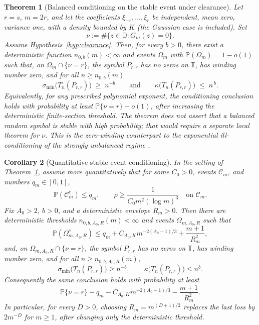 \documentclass[11pt]{amsart}
\numberwithin{equation}{section}
\newtheorem{theorem}{Theorem}[section]
\newtheorem{corollary}[theorem]{Corollary}
\theoremstyle{definition}
\theoremstyle{remark}
\newcommand{\T}{\mathbb T}
\newcommand{\D}{\mathbb D}
\newcommand{\Prob}{\mathbb P}
\newcommand{\smin}{\sigma_{\min}}
\newcommand{\kdn}{\kappa}
\begin{document}
\begin{theorem}[Balanced conditioning on the stable event under clearance]\label{thm:main}
Let $r=s$, $m=2r$, and let the coefficients $\xi_{-r},\dots,\xi_r$ be independent, mean zero, variance one, with a density bounded by $K$ (the Gaussian case is included). Set
\[
  \nu:=\#\{z\in\D:G_m(z)=0\}.
\]
Assume Hypothesis~\ref{hyp:clearance}. Then, for every \(b>0\), there exist a
deterministic function \(n_{0,b}(m)<\infty\) and events
\(\Omega_m\) with \(\Prob(\Omega_m)=1-o(1)\) such that, on
\(\Omega_m\cap\{\nu=r\}\), the symbol \(P_{r,r}\) has no zeros on \(\T\), has
winding number zero, and for all \(n\ge n_{0,b}(m)\)
\begin{equation}\label{eq:main}
  \smin\bigl(T_n(P_{r,r})\bigr)\;\ge\;n^{-b}
  \qquad\text{and}\qquad
  \kdn\bigl(T_n(P_{r,r})\bigr)\;\le\;n^{\,b}.
\end{equation}
Equivalently, for any prescribed polynomial exponent, the conditioning conclusion
holds with probability at least \(\Prob\{\nu=r\}-o(1)\), after increasing the
deterministic finite-section threshold. The theorem does not assert that a
balanced random symbol is stable with high probability; that would require a
separate local theorem for \(\nu\). This is the zero-winding counterpart to the
exponential ill-conditioning of the strongly unbalanced regime
\cite[Thm.~1.2]{Parity}.
\end{theorem}

\begin{corollary}[Quantitative stable-event conditioning]\label{cor:quant-main}
In the setting of Theorem~\ref{thm:main}, assume more quantitatively that for
some \(C_0>0\), events \(\mathcal C_m\), and numbers \(q_m\in[0,1]\),
\[
  \Prob(\mathcal C_m^c)\le q_m,\qquad
  \rho\ge\frac{1}{C_0m^2(\log m)^3}\quad\text{on }\mathcal C_m .
\]
Fix \(A_0>2\), \(b>0\), and a deterministic envelope \(R_m>0\).  Then there
are deterministic thresholds \(n_{0,b,A_0,R}(m)<\infty\) and events
\(\Omega_{m,A_0,R}\) such that
\[
  \Prob(\Omega_{m,A_0,R}^c)
  \le q_m+C_{A_0,K}m^{-2(A_0-1)/3}+\frac{m+1}{R_m^2},
\]
and, on \(\Omega_{m,A_0,R}\cap\{\nu=r\}\), the symbol \(P_{r,r}\) has no zeros on
\(\T\), has winding number zero, and for all \(n\ge n_{0,b,A_0,R}(m)\),
\[
  \smin\bigl(T_n(P_{r,r})\bigr)\ge n^{-b},
  \qquad
  \kdn\bigl(T_n(P_{r,r})\bigr)\le n^b .
\]
Consequently the same conclusion holds with probability at least
\[
  \Prob\{\nu=r\}-q_m-C_{A_0,K}m^{-2(A_0-1)/3}-\frac{m+1}{R_m^2}.
\]
In particular, for every \(D>0\), choosing \(R_m=m^{(D+1)/2}\) replaces the last
loss by \(2m^{-D}\) for \(m\ge1\), after changing only the deterministic
threshold.
\end{corollary}
\end{document}
